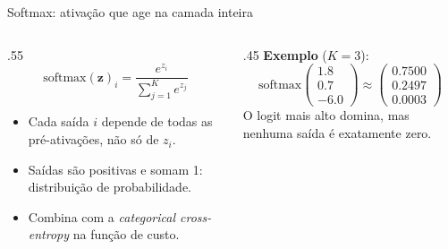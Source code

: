 \documentclass[aspectratio=169,xcolor=dvipsnames]{beamer}
\begin{document}
  \begin{frame}{Softmax: ativação que age na camada inteira}
    \begin{columns}
      \begin{column}{.55\linewidth}
        \[
          \mathrm{softmax}(\mathbf{z})_i = \frac{e^{z_i}}{\sum_{j=1}^{K} e^{z_j}}
        \]
        \begin{itemize}
          \item Cada saída $i$ depende de todas as pré-ativações, não só de $z_i$.
          \item Saídas são positivas e somam 1: distribuição de probabilidade.
          \item Combina com a \textit{categorical cross-entropy} na função de custo.
        \end{itemize}
      \end{column}
      \begin{column}{.45\linewidth}
        \centering
        \textbf{Exemplo} ($K=3$):
        \[
          \mathrm{softmax}\!\begin{pmatrix}1.8\\0.7\\-6.0\end{pmatrix}
          \approx
          \begin{pmatrix}0.7500\\0.2497\\0.0003\end{pmatrix}
        \]
        {\footnotesize O logit mais alto domina, mas nenhuma saída é exatamente zero.}
      \end{column}
    \end{columns}
  \end{frame}
\end{document}
